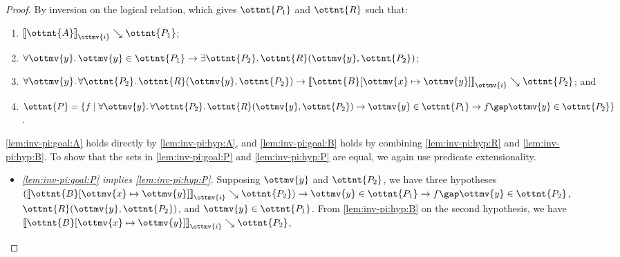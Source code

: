 \documentclass[a4paper,UKenglish,cleveref,autoref,thm-restate]{lipics-v2021}
\begin{document}
\begin{proof}
  By inversion on the logical relation,
  which gives $\ottnt{P_{{\mathrm{1}}}}$ and $\ottnt{R}$ such that:
  \begin{enumerate}[topsep=0pt,start=4]
    \item \label{lem:inv-pi:hyp:A} $ \mathopen{\llbracket}  \ottnt{A}  \mathclose{\rrbracket}_{ \ottmv{i} } \searrow  \ottnt{P_{{\mathrm{1}}}} $;
    \item \label{lem:inv-pi:hyp:R} $   \forall  \ottmv{y}  \mathpunct{.}  \ottmv{y}   \in  \ottnt{P_{{\mathrm{1}}}}   \to   \exists  \ottnt{P_{{\mathrm{2}}}}  \mathpunct{.}   \ottnt{R} ( \ottmv{y} ,  \ottnt{P_{{\mathrm{2}}}} )   $;
    \item \label{lem:inv-pi:hyp:B} $  \forall  \ottmv{y}  \mathpunct{.}   \forall  \ottnt{P_{{\mathrm{2}}}}  \mathpunct{.}   \ottnt{R} ( \ottmv{y} ,  \ottnt{P_{{\mathrm{2}}}} )     \to   \mathopen{\llbracket}   \ottnt{B} [  \ottmv{x}  \mapsto  \ottmv{y}  ]   \mathclose{\rrbracket}_{ \ottmv{i} } \searrow  \ottnt{P_{{\mathrm{2}}}}  $; and
    \item \label{lem:inv-pi:hyp:P} $\ottnt{P} =  \lbrace  f  \mid    \forall  \ottmv{y}  \mathpunct{.}   \forall  \ottnt{P_{{\mathrm{2}}}}  \mathpunct{.}   \ottnt{R} ( \ottmv{y} ,  \ottnt{P_{{\mathrm{2}}}} )     \to    \ottmv{y}  \in  \ottnt{P_{{\mathrm{1}}}}   \to    f  \gap  \ottmv{y}   \in  \ottnt{P_{{\mathrm{2}}}}     \rbrace $.
  \end{enumerate}
  \ref{lem:inv-pi:goal:A} holds directly by \ref{lem:inv-pi:hyp:A},
  and \ref{lem:inv-pi:goal:B} holds by combining \ref{lem:inv-pi:hyp:R} and \ref{lem:inv-pi:hyp:B}.
  To show that the sets in \ref{lem:inv-pi:goal:P} and \ref{lem:inv-pi:hyp:P} are equal,
  we again use predicate extensionality.
  \begin{itemize}[topsep=0pt]
    \item \textit{\ref{lem:inv-pi:goal:P} implies \ref{lem:inv-pi:hyp:P}.}
      Supposing $\ottmv{y}$ and $\ottnt{P_{{\mathrm{2}}}}$,
      we have three hypotheses $   (  \mathopen{\llbracket}   \ottnt{B} [  \ottmv{x}  \mapsto  \ottmv{y}  ]   \mathclose{\rrbracket}_{ \ottmv{i} } \searrow  \ottnt{P_{{\mathrm{2}}}}  )   \to   \ottmv{y}  \in  \ottnt{P_{{\mathrm{1}}}}    \to    f  \gap  \ottmv{y}   \in  \ottnt{P_{{\mathrm{2}}}}  $,
      $ \ottnt{R} ( \ottmv{y} ,  \ottnt{P_{{\mathrm{2}}}} ) $, and $ \ottmv{y}  \in  \ottnt{P_{{\mathrm{1}}}} $.
      From \ref{lem:inv-pi:hyp:B} on the second hypothesis,
      we have $ \mathopen{\llbracket}   \ottnt{B} [  \ottmv{x}  \mapsto  \ottmv{y}  ]   \mathclose{\rrbracket}_{ \ottmv{i} } \searrow  \ottnt{P_{{\mathrm{2}}}} $,

\end{itemize}
\end{proof}
\end{document}
